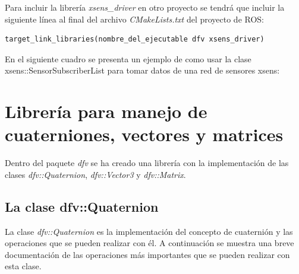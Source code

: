 \documentclass[12pt, a4paper]{report}
\begin{document}
Para incluir la librería \textit{xsens\_driver} en otro proyecto se tendrá que incluir la siguiente línea al final del archivo \textit{CMakeLists.txt} del proyecto de ROS:

\begin{lstlisting}
target_link_libraries(nombre_del_ejecutable dfv xsens_driver)
\end{lstlisting}

En el siguiente cuadro se presenta un ejemplo de como usar la clase xsens::SensorSubscriberList para tomar datos de una red de sensores xsens:

\lstset{inputencoding=utf8/latin1}


\section{Librería para manejo de cuaterniones, vectores y matrices}

Dentro del paquete \textit{dfv} se ha creado una librería con la implementación de las clases \textit{dfv::Quaternion}, \textit{dfv::Vector3} y \textit{dfv::Matrix}.

\subsection{La clase dfv::Quaternion}

La clase \textit{dfv::Quaternion} es la implementación del concepto de cuaternión y las operaciones que se pueden realizar con él. A continuación se muestra una breve documentación de las operaciones más importantes que se pueden realizar con esta clase.
\end{document}
